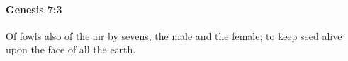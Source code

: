 
		\paragraph{Genesis 7:3} %
			\label{GENESIS-7-3}

			Of fowls also of the air by sevens, the male and the female; to keep seed alive upon the face of all the earth.


